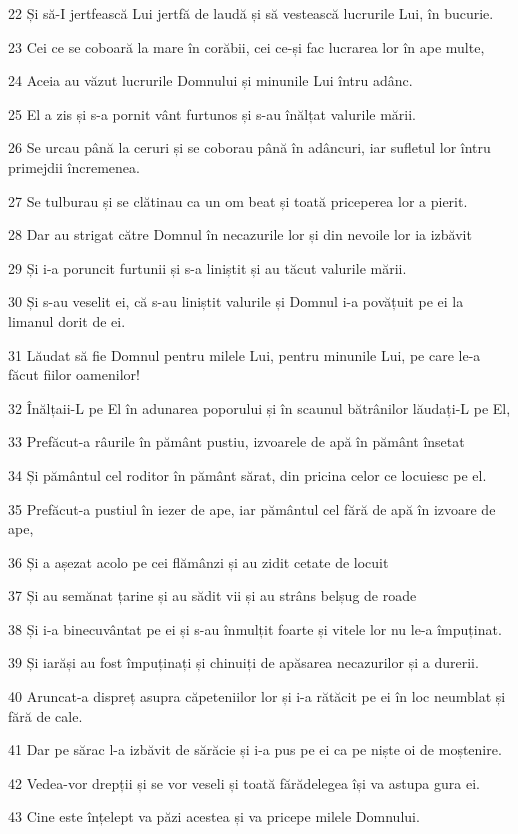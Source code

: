 \par 22 Și să-I jertfească Lui jertfă de laudă și să vestească lucrurile Lui, în bucurie.
\par 23 Cei ce se coboară la mare în corăbii, cei ce-și fac lucrarea lor în ape multe,
\par 24 Aceia au văzut lucrurile Domnului și minunile Lui întru adânc.
\par 25 El a zis și s-a pornit vânt furtunos și s-au înălțat valurile mării.
\par 26 Se urcau până la ceruri și se coborau până în adâncuri, iar sufletul lor întru primejdii încremenea.
\par 27 Se tulburau și se clătinau ca un om beat și toată priceperea lor a pierit.
\par 28 Dar au strigat către Domnul în necazurile lor și din nevoile lor ia izbăvit
\par 29 Și i-a poruncit furtunii și s-a liniștit și au tăcut valurile mării.
\par 30 Și s-au veselit ei, că s-au liniștit valurile și Domnul i-a povățuit pe ei la limanul dorit de ei.
\par 31 Lăudat să fie Domnul pentru milele Lui, pentru minunile Lui, pe care le-a făcut fiilor oamenilor!
\par 32 Înălțaii-L pe El în adunarea poporului și în scaunul bătrânilor lăudați-L pe El,
\par 33 Prefăcut-a râurile în pământ pustiu, izvoarele de apă în pământ însetat
\par 34 Și pământul cel roditor în pământ sărat, din pricina celor ce locuiesc pe el.
\par 35 Prefăcut-a pustiul în iezer de ape, iar pământul cel fără de apă în izvoare de ape,
\par 36 Și a așezat acolo pe cei flămânzi și au zidit cetate de locuit
\par 37 Și au semănat țarine și au sădit vii și au strâns belșug de roade
\par 38 Și i-a binecuvântat pe ei și s-au înmulțit foarte și vitele lor nu le-a împuținat.
\par 39 Și iarăși au fost împuținați și chinuiți de apăsarea necazurilor și a durerii.
\par 40 Aruncat-a dispreț asupra căpeteniilor lor și i-a rătăcit pe ei în loc neumblat și fără de cale.
\par 41 Dar pe sărac l-a izbăvit de sărăcie și i-a pus pe ei ca pe niște oi de moștenire.
\par 42 Vedea-vor drepții și se vor veseli și toată fărădelegea își va astupa gura ei.
\par 43 Cine este înțelept va păzi acestea și va pricepe milele Domnului.

